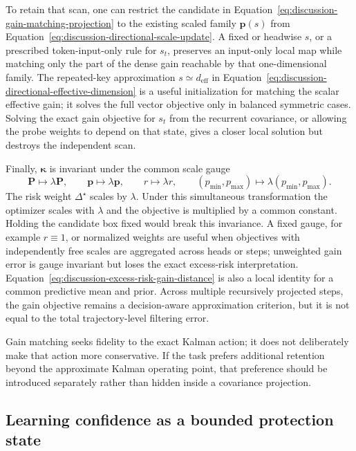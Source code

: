 \documentclass[11pt]{article}
\newcommand{\vct}[1]{\boldsymbol{#1}}
\begin{document}
To retain that scan, one can restrict the candidate in
Equation~\eqref{eq:discussion-gain-matching-projection} to the existing scaled family
$\vct{p}(s)$ from Equation~\eqref{eq:discussion-directional-scale-update}. A fixed or headwise
$s$, or a prescribed token-input-only rule for $s_t$, preserves an input-only local map while
matching only the part of the dense gain reachable by that one-dimensional family. The
repeated-key approximation $s\simeq d_{\mathrm{eff}}$ in
Equation~\eqref{eq:discussion-directional-effective-dimension} is a useful initialization for
matching the scalar effective gain; it solves the full vector objective only in balanced symmetric
cases. Solving the exact gain objective for $s_t$ from the recurrent covariance, or allowing the
probe weights to depend on that state, gives a closer local solution but destroys the independent
scan.

Finally, $\vct{\kappa}$ is invariant under the common scale gauge
\begin{equation}
  \vct{P}\mapsto\lambda\vct{P},
  \qquad \vct{p}\mapsto\lambda\vct{p},
  \qquad r\mapsto\lambda r,
  \qquad (p_{\min},p_{\max})\mapsto
    \lambda(p_{\min},p_{\max}).
  \label{eq:discussion-gain-matching-scale-gauge}
\end{equation}
The risk weight $\Delta^\star$ scales by $\lambda$. Under this simultaneous transformation the optimizer
scales with $\lambda$ and the objective is multiplied by a common constant. Holding the candidate
box fixed would break this invariance. A fixed gauge, for example $r\equiv1$, or normalized weights
are useful when objectives with independently free scales are aggregated across heads or steps;
unweighted gain error is gauge invariant but loses the exact excess-risk interpretation.
Equation~\eqref{eq:discussion-excess-risk-gain-distance} is also a local identity for a common
predictive mean and prior. Across multiple recursively projected steps, the gain objective remains
a decision-aware approximation criterion, but it is not equal to the total trajectory-level
filtering error.

Gain matching seeks fidelity to the exact Kalman action; it does not deliberately make that action
more conservative. If the task prefers additional retention beyond the approximate Kalman
operating point, that preference should be introduced separately rather than hidden inside a
covariance projection.

\subsection{Learning confidence as a bounded protection state}
\label{subsec:discussion-decision-aware-protection}
\end{document}
